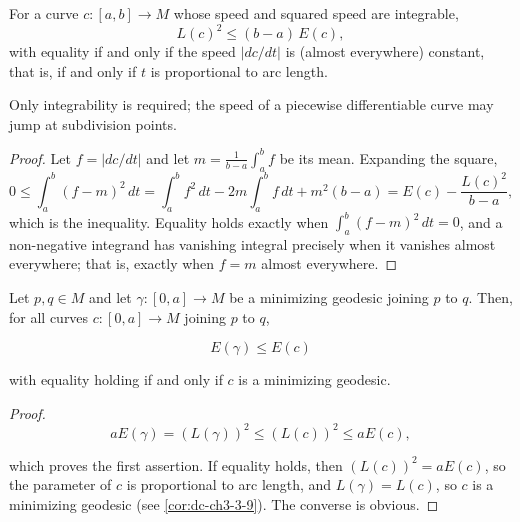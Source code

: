 \begin{lemma}
  \label{lem:dc-ch9-2-2-schwarz}


  For a curve $c:[a,b]\to M$ whose speed and squared speed are integrable,
  $$
  L(c)^2\le (b-a)\,E(c),
  $$
  with equality if and only if the speed $|dc/dt|$ is (almost everywhere) constant, that
  is, if and only if $t$ is proportional to arc length.

  Only integrability is required; the speed of a piecewise differentiable curve
  may jump at subdivision points.
\end{lemma}
\begin{proof}

  \sketch
  Let $f=|dc/dt|$ and let $m=\frac{1}{b-a}\int_a^b f$ be its mean. Expanding the square,
  $$
  0\le\int_a^b (f-m)^2\,dt=\int_a^b f^2\,dt-2m\int_a^b f\,dt+m^2(b-a)=E(c)-\frac{L(c)^2}{b-a},
  $$
  which is the inequality. Equality holds exactly when $\int_a^b(f-m)^2\,dt=0$, and a
  non-negative integrand has vanishing integral precisely when it vanishes almost
  everywhere; that is, exactly when $f=m$ almost everywhere.
\end{proof}
\begin{lemma}
  \label{lem:dc-ch9-2-3}


  Let $p,q\in M$ and let $\gamma:[0,a]\to M$ be a minimizing geodesic joining $p$ to
  $q$. Then, for all curves $c:[0,a]\to M$ joining $p$ to $q$,

  $$
  E(\gamma)\le E(c)
  $$

  with equality holding if and only if $c$ is a minimizing geodesic.
\end{lemma}
\begin{proof}

  \sketch
  $$
  aE(\gamma)=(L(\gamma))^2\le(L(c))^2\le aE(c),
  $$

  which proves the first assertion. If equality holds, then $(L(c))^2=aE(c)$, so the
  parameter of $c$ is proportional to arc length, and $L(\gamma)=L(c)$, so $c$ is a
  minimizing geodesic (see \cref{cor:dc-ch3-3-9}). The converse is obvious.

\end{proof}
